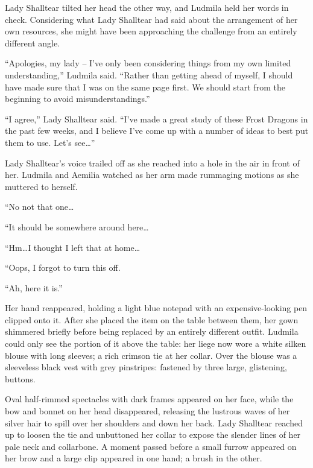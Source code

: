  

Lady Shalltear tilted her head the other way, and Ludmila held her words in check. Considering what Lady Shalltear had said about the arrangement of her own resources, she might have been approaching the challenge from an entirely different angle.

 

“Apologies, my lady – I’ve only been considering things from my own limited understanding,” Ludmila said. “Rather than getting ahead of myself, I should have made sure that I was on the same page first. We should start from the beginning to avoid misunderstandings.”

 

“I agree,” Lady Shalltear said. “I’ve made a great study of these Frost Dragons in the past few weeks, and I believe I’ve come up with a number of ideas to best put them to use. Let’s see…”

 

Lady Shalltear’s voice trailed off as she reached into a hole in the air in front of her. Ludmila and Aemilia watched as her arm made rummaging motions as she muttered to herself.

 

“No not that one…

 

“It should be somewhere around here…

 

“Hm…I thought I left that at home…

 

“Oops, I forgot to turn this off.

 

“Ah, here it is.”

 

Her hand reappeared, holding a light blue notepad with an expensive-looking pen clipped onto it. After she placed the item on the table between them, her gown shimmered briefly before being replaced by an entirely different outfit. Ludmila could only see the portion of it above the table: her liege now wore a white silken blouse with long sleeves; a rich crimson tie at her collar. Over the blouse was a sleeveless black vest with grey pinstripes: fastened by three large, glistening, buttons.

 

Oval half-rimmed spectacles with dark frames appeared on her face, while the bow and bonnet on her head disappeared, releasing the lustrous waves of her silver hair to spill over her shoulders and down her back. Lady Shalltear reached up to loosen the tie and unbuttoned her collar to expose the slender lines of her pale neck and collarbone. A moment passed before a small furrow appeared on her brow and a large clip appeared in one hand; a brush in the other.

